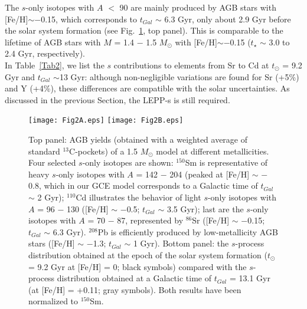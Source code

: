 \documentclass[manuscript]{aastex}
\begin{document}
The $s$-only isotopes with $A$ $<$ 90 are mainly produced by AGB stars with [Fe/H]$\sim$$-$0.15, which 
corresponds to $t_{Gal}$ $\sim$ 6.3 Gyr, 
only about 2.9 Gyr before the solar system formation (see Fig.~\ref{Fig2}, top panel). 
This is comparable to the 
lifetime of AGB stars with $M$ = 1.4 $-$ 1.5 $M_\odot$ with [Fe/H]$\sim$$-$0.15
($t_{\star}$ $\sim$ 3.0 to 2.4 Gyr, respectively).
\\
In Table~\ref{Tab2}, we list the $s$ contributions to elements from Sr to Cd at $t_\odot$ = 9.2 Gyr
and $t_{Gal}$ $\sim$13 Gyr: although non-negligible variations are found for Sr (+5\%) and Y (+4\%), 
these differences are compatible with the solar uncertainties. As
discussed in the previous Section, the LEPP-s is still required.





\begin{figure} 
\vspace{-0.7cm}
\texttt{[image: Fig2A.eps]} 
\vspace{-0.5cm}
\texttt{[image: Fig2B.eps]} 
\caption{\label{Fig2}
Top panel: AGB yields (obtained with a weighted average of standard $^{13}$C-pockets) of a 1.5 $M_\odot$ 
model at different metallicities. Four selected $s$-only isotopes are shown: 
$^{150}$Sm is representative of heavy $s$-only isotopes with $A$ = 142 $-$ 204 (peaked at
[Fe/H] $\sim$ $-$0.8, which in our GCE model corresponds to a Galactic time of $t_{Gal}$ $\sim$ 2 Gyr); 
$^{110}$Cd illustrates the behavior of light $s$-only isotopes with
$A$ = 96 $-$ 130 ([Fe/H] $\sim$ $-$0.5; $t_{Gal}$ $\sim$ 3.5 Gyr); last are the $s$-only isotopes with 
$A$ = 70 $-$ 87, represented by $^{86}$Sr ([Fe/H] $\sim$ $-$0.15; $t_{Gal}$ $\sim$ 6.3 Gyr).
 $^{208}$Pb is efficiently produced by low-metallicity AGB 
stars ([Fe/H] $\sim$ $-$1.3; $t_{Gal}$ $\sim$ 1 Gyr).
Bottom panel: the $s$-process distribution obtained at the epoch of the solar 
system formation ($t_\odot$ = 9.2 Gyr at [Fe/H] = 0; black symbols) compared with the $s$-process distribution 
obtained at a Galactic time of $t_{Gal}$ = 13.1 Gyr (at [Fe/H] = +0.11; gray symbols). Both results have been
normalized to $^{150}$Sm. }
\end{figure}
\end{document}

